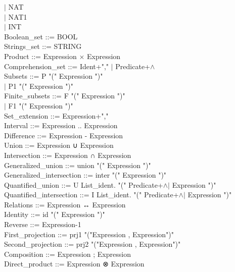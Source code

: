 \documentclass[12pt,a4paper,draft]{report}
\begin{document}
{\begin{sloppypar}
  \hspace*{0.20in} $|$  NAT\\
  \hspace*{0.20in} $|$  NAT1\\
  \hspace*{0.20in} $|$  INT\\
Boolean\_set    ::=  BOOL\\
Strings\_set   ::=  STRING\\
Product   ::=  Expression $\times$ Expression \\
Comprehension\_set ::= { Ident+","\hspace*{0.20in} $|$ Predicate+$\land$ } \\
Subsets   ::=  P "(" Expression ")"\\
   \hspace*{0.20in} $|$  P1 "(" Expression ")" \\
Finite\_subsets  ::=  F "(" Expression ")"\\
   \hspace*{0.20in} $|$  F1 "(" Expression ")" \\
Set\_extension  ::= { Expression+"," } \\
Interval   ::=  Expression .. Expression \\
Difference   ::=  Expression - Expression\\ 
Union     ::=  Expression ∪ Expression \\
Intersection   ::=  Expression ∩ Expression \\
Generalized\_union  ::= union "(" Expression ")" \\
Generalized\_intersection ::= inter "(" Expression ")" \\
Quantified\_union ::=  U List\_ident. "(" Predicate+$\land$$|$ Expression ")" \\
Quantified\_intersection ::=  I List\_ident. "(" Predicate+$\land$$|$ Expression ")" \\
Relations   ::=  Expression ↔ Expression \\
Identity   ::= id "(" Expression ")" \\
Reverse   ::=  Expression-1 \\
First\_projection  ::= prj1 "("Expression , Expression")" \\
Second\_projection   ::= prj2 "("Expression , Expression")" \\
Composition   ::=  Expression ; Expression \\
Direct\_product  ::=  Expression ⊗ Expression\\ 

\end{sloppypar}}
\end{document}
